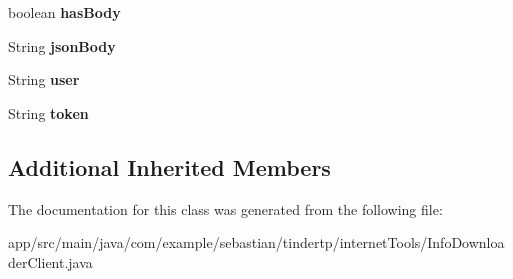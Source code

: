 \begin{DoxyCompactItemize}
\item 
boolean {\bfseries has\+Body}\hypertarget{classcom_1_1example_1_1sebastian_1_1tindertp_1_1internetTools_1_1InfoDownloaderClient_a2217d1c1ea32c15b97858b154b471f16}{}\label{classcom_1_1example_1_1sebastian_1_1tindertp_1_1internetTools_1_1InfoDownloaderClient_a2217d1c1ea32c15b97858b154b471f16}

\item 
String {\bfseries json\+Body}\hypertarget{classcom_1_1example_1_1sebastian_1_1tindertp_1_1internetTools_1_1InfoDownloaderClient_a89b084e2a602542f33e7659bb007d482}{}\label{classcom_1_1example_1_1sebastian_1_1tindertp_1_1internetTools_1_1InfoDownloaderClient_a89b084e2a602542f33e7659bb007d482}

\item 
String {\bfseries user}\hypertarget{classcom_1_1example_1_1sebastian_1_1tindertp_1_1internetTools_1_1InfoDownloaderClient_ab21b06c36213edd601a1a8e341a34af5}{}\label{classcom_1_1example_1_1sebastian_1_1tindertp_1_1internetTools_1_1InfoDownloaderClient_ab21b06c36213edd601a1a8e341a34af5}

\item 
String {\bfseries token}\hypertarget{classcom_1_1example_1_1sebastian_1_1tindertp_1_1internetTools_1_1InfoDownloaderClient_ae877efea787ae8e75c21c27ab9399623}{}\label{classcom_1_1example_1_1sebastian_1_1tindertp_1_1internetTools_1_1InfoDownloaderClient_ae877efea787ae8e75c21c27ab9399623}

\end{DoxyCompactItemize}
\subsection*{Additional Inherited Members}


The documentation for this class was generated from the following file\+:\begin{DoxyCompactItemize}
\item 
app/src/main/java/com/example/sebastian/tindertp/internet\+Tools/Info\+Downloader\+Client.\+java\end{DoxyCompactItemize}
